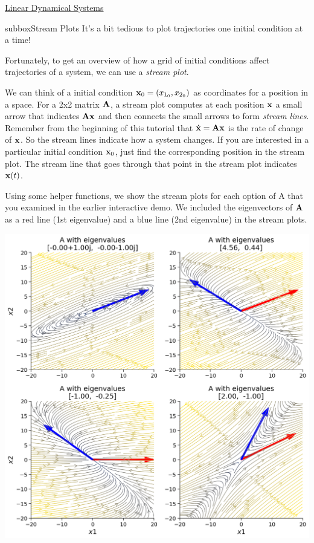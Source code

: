 \begin{textbox}{\href{https://compneuro.neuromatch.io/tutorials/W2D2_LinearSystems/student/W2D2_Tutorial1.html}{Linear Dynamical Systems } }
\begin{subbox}{subbox}{Stream Plots}
\scriptsize
It's a bit tedious to plot trajectories one initial condition at a time!

Fortunately, to get an overview of how a grid of initial conditions affect trajectories of a system, we can use a \textit{stream plot}. 

We can think of a initial condition ${\bf x}_0=(x_{1_0},x_{2_0})$  as coordinates for a position in a space. For a 2x2 matrix $\bf A$, a stream plot computes at each position $\bf x$ a small arrow that indicates $\bf Ax$ and then connects the small arrows to form \textit{stream lines}. Remember from the beginning of this tutorial that $\dot {\bf x} = \bf Ax$ is the rate of change of $\bf x$. So the stream lines indicate how a system changes. If you are interested in a particular initial condition ${\bf x}_0$, just find the corresponding position in the stream plot. The stream line that goes through that point in the stream plot indicates ${\bf x}(t)$.

Using some helper functions, we show the stream plots for each option of A that you examined in the earlier interactive demo. We included the eigenvectors of $\bf A$ as a red line (1st eigenvalue) and a blue line (2nd eigenvalue) in the stream plots.

\centering
\includegraphics[scale=0.25]{Figures/LS/LSFigure3.png}
\end{subbox}
\end{textbox}
